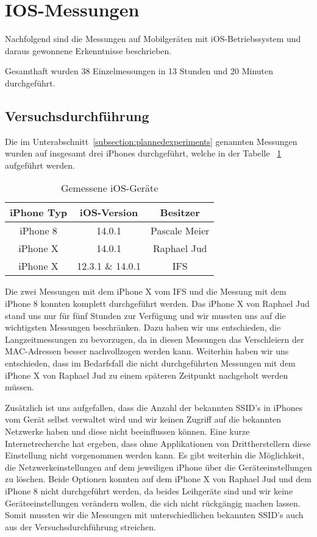\section{IOS-Messungen
\label{section:iosmeasurements}}
Nachfolgend sind die Messungen auf Mobilgeräten mit iOS-Betriebssystem
und daraus gewonnene Erkenntnisse beschrieben.

Gesamthaft wurden 38 Einzelmessungen in 13 Stunden und 20 Minuten durchgeführt.

\subsection{Versuchsdurchführung}
Die im Unterabschnitt~\ref{subsection:plannedexperiments} genannten Messungen
wurden auf insgesamt drei iPhones durchgeführt, welche in der Tabelle 
~\ref{table:measurediosdevices} aufgeführt werden. 

\begin{table}[h!]
	\centering
	\begin{tabular}{|c|c|c|}
		\hline
        \textbf{iPhone Typ} & \textbf{iOS-Version} & \textbf{Besitzer} \\
        \hline
        iPhone 8 & 14.0.1 & Pascale Meier \\
        iPhone X & 14.0.1 & Raphael Jud \\
        iPhone X & 12.3.1 \& 14.0.1 & IFS \\
        \hline
    \end{tabular}
    \caption{Gemessene iOS-Geräte
    \label{table:measurediosdevices}}  
\end{table}

Die zwei Messungen mit dem iPhone X vom IFS und die Messung mit dem iPhone 8 konnten 
komplett durchgeführt werden. 
Das iPhone X von Raphael Jud stand uns nur für fünf Stunden zur Verfügung und wir mussten uns
auf die wichtigsten Messungen beschränken. 
Dazu haben wir uns entschieden, die Langzeitmessungen zu bevorzugen, 
da in diesen Messungen das Verschleiern der MAC-Adressen besser nachvollzogen 
werden kann. 
Weiterhin haben wir uns entschieden, dass im Bedarfsfall die nicht 
durchgeführten Messungen mit dem iPhone X von Raphael Jud zu einem späteren Zeitpunkt 
nachgeholt werden müssen.

Zusätzlich ist uns aufgefallen, dass die Anzahl der bekannten SSID's in iPhones 
vom Gerät selbst verwaltet wird und wir keinen Zugriff auf die bekannten 
Netzwerke haben und diese nicht beeinflussen können.
Eine kurze Internetrecherche hat ergeben, dass ohne Applikationen von 
Drittherstellern diese Einstellung nicht vorgenommen werden kann.
Es gibt weiterhin die Möglichkeit, die Netzwerkeinstellungen auf dem jeweiligen
iPhone über die Geräteeinstellungen zu löschen.
Beide Optionen konnten auf dem iPhone X von Raphael Jud und dem iPhone 8 nicht durchgeführt
werden, da beides Leihgeräte sind und wir keine Geräteeinstellungen verändern
wollen, die sich nicht rückgängig machen lassen.
Somit mussten wir die Messungen mit unterschiedlichen bekannten SSID's 
auch aus der Versuchsdurchführung streichen.

